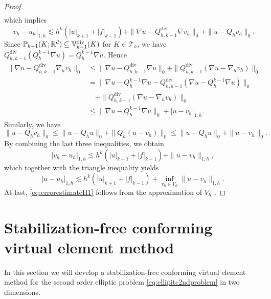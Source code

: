 \documentclass[10pt]{amsart}
\renewcommand{\div}{\operatorname{div}}
\numberwithin{equation}{section}
\begin{document}
\begin{proof}
\begin{align*}
\end{align*}
which implies
$$
|v_h-u_h|_{1,h}\lesssim h^k(|u|_{k+1}+|f|_{k-1})+\|\nabla u-Q_{h,k-1}^{\div}\nabla v_h\|_0+\|u-Q_hv_h\|_0.
$$
Since $\mathbb P_{k-1}(K;\mathbb R^d)\subseteq\mathbb{V}_{k-1}^{\rm div}(K)$ for $K\in\mathcal T_h$, we have $Q_{h,k-1}^{\div}(Q_h^{k-1}\nabla u)=Q_h^{k-1}\nabla u$. Hence
\begin{align*}    
\|\nabla u-Q_{h,k-1}^{\div}\nabla_h v_h\|_0&\leq \|\nabla u-Q_{h,k-1}^{\div}\nabla u\|_0+\|Q_{h,k-1}^{\div}(\nabla u-\nabla_h v_h)\|_0\\
&= \|\nabla u-Q_h^{k-1}\nabla u-Q_{h,k-1}^{\div}(\nabla u-Q_h^{k-1}\nabla u)\|_0\\
&\quad+\|Q_{h,k-1}^{\div}(\nabla u-\nabla_h v_h)\|_0 \\
&\leq \|\nabla u-Q_h^{k-1}\nabla u\|_0+|u-v_h|_{1,h}.
\end{align*}
Similarly, we have
$$
\|u-Q_hv_h\|_0\leq \|u-Q_hu\|_0+\|Q_h(u-v_h)\|_0\leq \|u-Q_hu\|_0+\|u-v_h\|_0.
$$
By combining the last three inequalities, we obtain
$$
|v_h-u_h|_{1,h}\lesssim h^k(|u|_{k+1}+|f|_{k-1})+\|u-v_h\|_{1,h},
$$
which together with the triangle inequality yields
$$
|u-u_h|_{1,h}\lesssim h^k(|u|_{k+1}+|f|_{k-1})+\inf_{v_h\in V_h}\|u-v_h\|_{1,h}.
$$
At last, \eqref{eq:errorestimateH1} follows from the approximation of $V_h$ \cite{ChenHuang2020ncvem}.
\end{proof}





\section{Stabilization-free conforming virtual element method}\label{sec:stabfreecfmvem}

In this section we will develop a stabilization-free conforming virtual element method for the second order elliptic problem \eqref{eq:ellipitc2ndproblem} in two dimensions.
\end{document}
